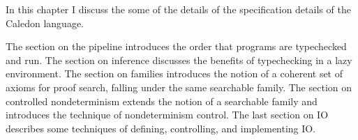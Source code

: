 In this chapter I discuss the some of the details of the 
specification details of the Caledon language.  

The section on the pipeline introduces the order that programs are typechecked and run. 
The section on inference discusses the benefits of typechecking in a lazy environment.
The section on families introduces the notion of a coherent set of axioms for proof search, 
falling under the same searchable family.
The section on controlled nondeterminism extends the notion of a searchable 
family and introduces the technique of nondeterminism control. 
The last section on IO describes some techniques of defining, controlling, and implementing IO.